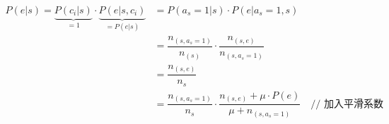 \begin{align}
P(e|s)
= \underset{=1}{\underbrace{P(c_i|s)}} \cdot \underset{=P(e|s)}{\underbrace{P(e|s,c_i)}}
&= P(a_{s}=1|s) \cdot P(e|a_{s}=1,s) \\
&= \dfrac{n_{(s,a_{s}=1)}}{n_{(s)}} \cdot \dfrac{n_{(s,e)}}{n_{(s,a_{s}=1)}} \\
&= \dfrac{n_{(s,e)}}{n_{s}} \\
&= \dfrac{n_{(s,a_{s}=1)}}{n_{s}} \cdot \dfrac{n_{(s,e)} + \mu \cdot P(e)}{\mu + n_{(s,a_{s}=1)}} \quad \textrm{// 加入平滑系数}
\end{align}